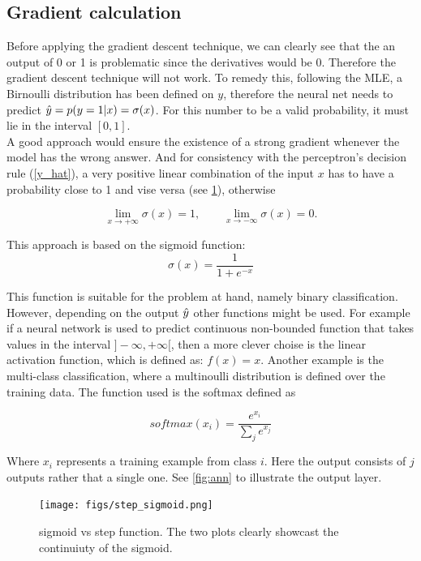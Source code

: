 \subsection{Gradient calculation}\label{sec:cal_gradient}

Before applying the gradient descent technique, we can clearly see that the an output of 0 or 1 is problematic since the derivatives would be 0. Therefore the gradient descent technique will not work. To remedy this, following the MLE, a Birnoulli distribution has been defined on $y$, therefore the neural net needs to predict $\hat{y} = p(y = 1 | x) = \sigma (x)$. For this number to be a valid probability, it must lie in the interval $[0, 1]$. \\
A good approach would ensure the existence of a strong gradient whenever the model has the wrong answer. And for consistency with the perceptron's decision rule (\cref{y_hat}), a very positive linear combination of the input $x$ has to have a probability close to 1 and vise versa (see \cref{fig:step_sigmoid}), otherwise

\begin{equation}
  \label{equ:limits}
  \lim_{x \rightarrow +\infty} \sigma(x) = 1, \qquad \lim_{x \rightarrow -\infty} \sigma(x) = 0.
\end{equation}

This approach is based on the sigmoid function:
 $$
 \sigma(x) = \frac{1}{1 + e^{-x}}
 $$

This function is suitable for the problem at hand, namely binary classification. However, depending on the output $\hat{y}$ other functions might be used. For example if a neural network is used to predict continuous non-bounded function that takes values in the interval $]-\infty, +\infty[$, then a more clever choise is the linear activation function, which is defined as: $f(x) = x$. Another example is the multi-class classification, where a multinoulli distribution is defined over the training data. The function used is the softmax defined as

$$
softmax(x_i) = \frac{e^{x_i}}{\sum_j e^{x_j}}
$$

Where $x_i$ represents a training example from class $i$. Here the output consists of $j$ outputs rather that a single one. See \cref{fig:ann} to illustrate the output layer.

\begin{figure}[!htpb]
  \centering
  \texttt{[image: figs/step\_sigmoid.png]}
  \caption[sigmoid vs step function]{sigmoid vs step function. The two plots clearly showcast the continuiuty of the sigmoid.}\label{fig:step_sigmoid}
\end{figure}

